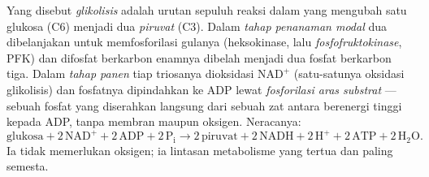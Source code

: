 \begin{definition}[Glikolisis]\label{def:b1:respiration-fermentation:glycolysis}
Yang disebut \emph{glikolisis} adalah urutan sepuluh reaksi  dalam
 yang mengubah satu glukosa (C6) menjadi dua \emph{piruvat} (C3).
Dalam \emph{tahap penanaman modal} dua  dibelanjakan untuk
memfosforilasi gulanya (heksokinase, lalu \emph{fosfofruktokinase},
PFK) dan difosfat berkarbon enamnya dibelah menjadi dua fosfat
berkarbon tiga. Dalam \emph{tahap panen} tiap triosanya dioksidasi
$\mathrm{NAD^+}$ (satu-satunya oksidasi glikolisis) dan fosfatnya
dipindahkan ke ADP lewat \emph{fosforilasi aras
substrat} --- sebuah fosfat yang
diserahkan langsung dari sebuah zat antara berenergi tinggi kepada ADP,
tanpa membran maupun oksigen. Neracanya:
\[
\text{glukosa} + 2\,\mathrm{NAD^+} + 2\,\mathrm{ADP} + 2\,\mathrm{P_i}
\to 2\,\text{piruvat} + 2\,\mathrm{NADH} + 2\,\mathrm{H^+} + 2\,\mathrm{ATP} + 2\,\mathrm{H_2O} .
\]
Ia tidak memerlukan oksigen; ia lintasan metabolisme yang tertua dan
paling semesta.
\end{definition}

